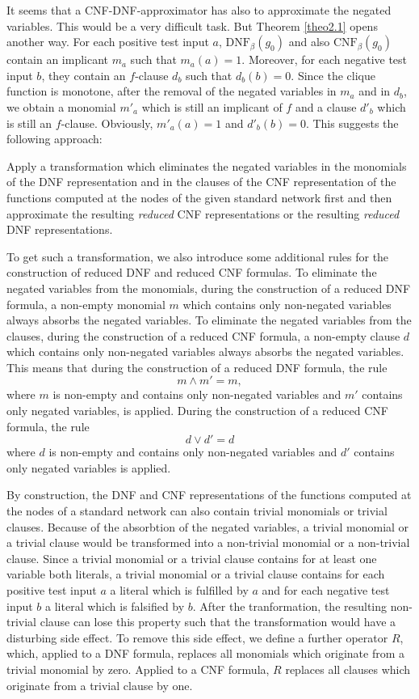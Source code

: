 \documentclass[11pt]{article}
\begin{document}
It seems that a CNF-DNF-approximator has also to approximate the negated variables. This would be a very
difficult task. But Theorem \ref{theo2.1} opens another way. For each positive test input $a$,
$\mbox{DNF}_{\beta}(g_0)$ and also $\mbox{CNF}_{\beta}(g_0)$ contain an implicant $m_a$ such that $m_a(a) = 1$.
Moreover, for each negative test input $b$, they contain an $f$-clause $d_b$ such that $d_b(b) = 0$. Since the
clique function is monotone, after the removal of the negated variables in $m_a$ and in $d_b$, we obtain a
monomial $m'_a$ which is still an implicant of $f$ and a clause $d'_b$ which is still an $f$-clause. Obviously,
$m'_a(a) = 1$ and $d'_b(b) = 0$. This suggests the following approach:

Apply a transformation which eliminates the negated variables in the monomials of the DNF representation and
in the clauses of the CNF representation of the functions computed at the nodes of the given standard network
first and then approximate the resulting {\em reduced\/} CNF representations or the resulting {\em reduced\/}
DNF representations.

To get such a transformation, we also introduce some additional rules for the construction of reduced DNF and
reduced CNF formulas. To eliminate the negated variables from the monomials, during the construction of a reduced
DNF formula, a non-empty monomial $m$ which contains only non-negated variables always absorbs the negated
variables. To eliminate the negated variables from the clauses, during the construction of a reduced CNF formula,
a non-empty clause $d$ which contains only non-negated variables always absorbs the negated variables.
This means that during the construction of a reduced DNF formula, the rule
$$
m \wedge m' = m,
$$
where $m$ is non-empty and contains only non-negated variables and $m'$ contains only negated variables, is
applied. During the construction of a reduced CNF formula, the rule
$$
d \vee d' = d
$$
where $d$ is non-empty and contains only non-negated variables and $d'$ contains only negated variables
is applied.

By construction, the DNF and CNF representations of the functions computed at the nodes of a standard network
can also contain trivial monomials or trivial clauses. Because of the absorbtion of the negated variables,
a trivial monomial or a trivial clause would be transformed into a non-trivial monomial or a non-trivial
clause. Since a trivial monomial or a trivial clause contains for at least one variable both literals, a
trivial monomial or a trivial clause contains for
each positive test input $a$ a literal which is fulfilled by $a$ and for each negative test input $b$ a literal
which is falsified by $b$. After the tranformation, the resulting non-trivial clause can lose this property
such that the transformation would have a disturbing side effect. To remove this side effect, we define a
further operator $R$, which, applied to a DNF formula, replaces all monomials which originate from a trivial
monomial by zero. Applied to a CNF formula, $R$ replaces all clauses which originate from a trivial clause
by one.
\end{document}
